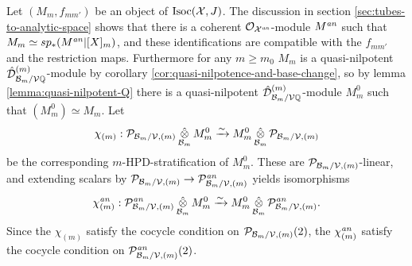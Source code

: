 \documentclass{article}
\theoremstyle{change}
\numberwithin{equation}{subsubsection}
\begin{document}
Let $(M_m,f_{mm'})$ be an object of $\mathrm{Isoc}({\cal X},J)$. The discussion in
section \ref{sec:tubes-to-analytic-space} shows that there is a
coherent ${\cal O}_{{\cal X}^{\mathit{an}}}$-module $M^{\mathit{an}}$ such that
$M_m\simeq sp_*(M^{\mathit{an}}|[X]_m)$, and these identifications are
compatible with the $f_{mm'}$ and the restriction maps. Furthermore
for any $m\ge m_0$ $M_m$ is a quasi-nilpotent
${\hat{\cal D}}^{({m})}_{{\cal B}_m/{\cal V}{\mathbb Q}}$-module by corollary
\ref{cor:quasi-nilpotence-and-base-change}, so by lemma
\ref{lemma:quasi-nilpotent-Q} there is a quasi-nilpotent
${\hat{\cal D}}^{({m})}_{{\cal B}_m/{\cal V}{\mathbb Q}}$-module $M^0_m$ such that
$(M^0_m)\simeq M_m$. Let
\begin{displaymath}
  \chi_{(m)}:{\cal P}_{{\cal B}_m/{\cal V},(m)}\mathop{\hat\otimes}_{{\cal B}_m}M^0_m\xrightarrow{\sim}
  M^0_m\mathop{\hat\otimes}_{{\cal B}_m}{\cal P}_{{\cal B}_m/{\cal V},(m)} 
\end{displaymath}
be the corresponding $m$-HPD-stratification of $M^0_m$. These are
${\cal P}_{{\cal B}_m/{\cal V},(m)} $-linear, and extending scalars by
${\cal P}_{{\cal B}_m/{\cal V},(m)}\to{\cal P}^{\mathit{an}}_{{\cal B}_m/{\cal V},(m)}$ yields isomorphisms
\begin{equation}
  \label{eq:tube-formal-to-analytic1}
  \chi^{\mathit{an}}_{(m)}:{\cal P}^{\mathit{an}}_{{\cal B}_m/{\cal V},(m)}\mathop{\hat\otimes}_{{\cal B}_m}M^0_m\xrightarrow{\sim}
  M^0_m\mathop{\hat\otimes}_{{\cal B}_m}{\cal P}^{\mathit{an}}_{{\cal B}_m/{\cal V},(m)}.  
\end{equation}
Since the $\chi_{(m)}$ satisfy the cocycle condition on
${\cal P}_{{\cal B}_m/{\cal V},(m)}(2)$, the $\chi^{\mathit{an}}_{(m)}$ satisfy the cocycle
condition on ${\cal P}^{\mathit{an}}_{{\cal B}_m/{\cal V},(m)}(2)$. 
\end{document}
